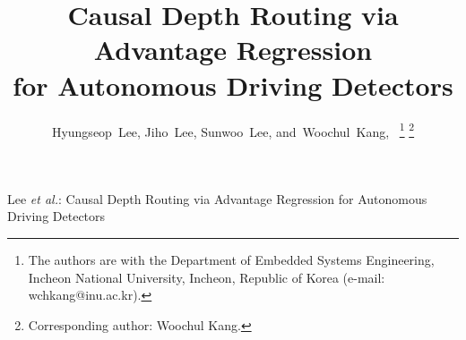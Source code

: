 \documentclass[lettersize,journal]{IEEEtran}
\begin{document}
\title{Causal Depth Routing via Advantage Regression\\for Autonomous Driving Detectors}

\author{Hyungseop~Lee,
        Jiho~Lee,
        Sunwoo~Lee,
        and~Woochul~Kang,~
    \thanks{
        The authors are with the Department of Embedded Systems Engineering,
        Incheon National University, Incheon, Republic of Korea
        (e-mail: wchkang@inu.ac.kr).
    }
    \thanks{
        Corresponding author: Woochul Kang.
    }
}

%
{Lee \MakeLowercase{\textit{et al.}}: Causal Depth Routing via Advantage Regression for Autonomous Driving Detectors}

\maketitle










\end{document}
